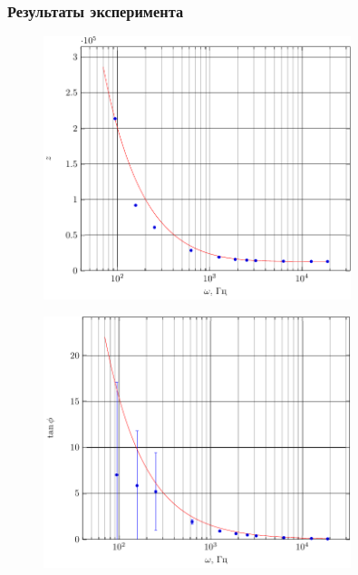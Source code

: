 \subsubsection{Результаты эксперимента}

\begin{figure}[H]
	\centering
	\includegraphics[width=0.8\textwidth]{img/chem1_z}
	\label{fig:RC_z}
\end{figure}
\begin{figure}[H]
	\centering
	\includegraphics[width=0.8\textwidth]{img/chem1_phi}
	\label{fig:RC_tanphi}
\end{figure}

